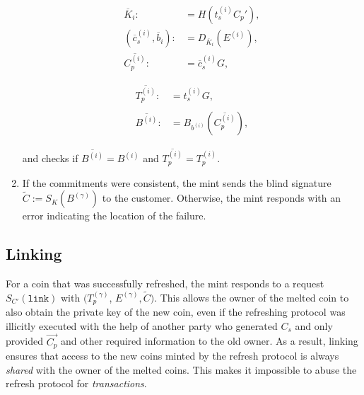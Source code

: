 \documentclass{llncs}
\begin{document}
\begin{enumerate}
    \vspace{-2ex}
    \begin{minipage}{5cm}
    \begin{align*}
      \overline{K}_i :&= H(t_s^{(i)} C_p'), \\
      (\overline{c}_s^{(i)}, \overline{b}_i) :&= D_{\overline{K}_i}(E^{(i)}), \\
     \overline{C^{(i)}_p} :&= \overline{c}_s^{(i)} G,
     \end{align*}
     \end{minipage}
    \begin{minipage}{5cm}
      \begin{align*}
       \overline{T_p^{(i)}} :&= t_s^{(i)} G, \\ \\
      \overline{B^{(i)}} :&= B_{b^{(i)}}(\overline{C_p^{(i)}}),
      \end{align*}
    \end{minipage}

    and checks if $\overline{B^{(i)}} = B^{(i)}$
    and $\overline{T^{(i)}_p} = T^{(i)}_p$.

  \item \label{step:refresh-done} If the commitments were consistent,
    the mint sends the blind signature $\widetilde{C} :=
    S_{K}(B^{(\gamma)})$ to the customer.  Otherwise, the mint responds
    with an error indicating the location of the failure.
\end{enumerate}

%

\subsection{Linking}

For a coin that was successfully refreshed, the mint responds to a
request $S_{C'}(\mathtt{link})$ with $(T^{(\gamma)}_p$, $E^{(\gamma)},
\widetilde{C})$.
%
This allows the owner of the melted coin to also obtain the private
key of the new coin, even if the refreshing protocol was illicitly
executed with the help of another party who generated $C_s$ and only
provided $\vec{C_p}$ and other required information to the old owner.
As a result, linking ensures that access to the new coins minted by
the refresh protocol is always {\em shared} with the owner of the
melted coins.  This makes it impossible to abuse the refresh protocol
for {\em transactions}.
\end{document}
